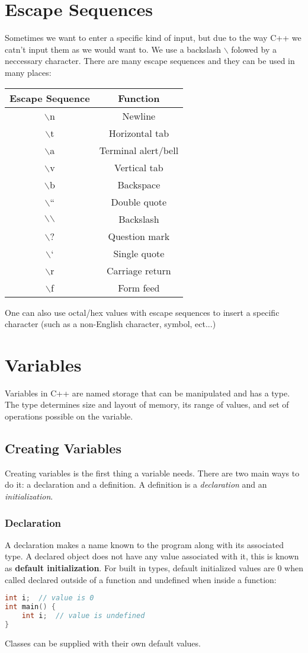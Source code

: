 \documentclass[12pt, a4paper]{report}
\begin{document}
\section{Escape Sequences}
Sometimes we want to enter a specific kind of input, but due to the way C++ we catn't input them as we would want to. We use a backslash $\backslash$ folowed by a neccessary character. There are many escape sequences and they can be used in many places:
\begin{center}
	\begin{tabular}{ |c|c| }
		\hline
		\textbf{Escape Sequence} & \textbf{Function} \\
		\hline
		$\backslash$n & Newline \\
		\hline
		$\backslash$t & Horizontal tab \\
		\hline
		$\backslash$a & Terminal alert/bell \\
		\hline
		$\backslash$v & Vertical tab \\
		\hline
		$\backslash$b & Backspace \\
		\hline
		$\backslash$`` & Double quote \\
		\hline
		$\backslash$$\backslash$ & Backslash \\
		\hline
		$\backslash$? & Question mark \\
		\hline
		$\backslash$` & Single quote \\
		\hline
		$\backslash$r & Carriage return \\
		\hline
		$\backslash$f & Form feed \\
		\hline
	\end{tabular}
\end{center}
One can also use octal/hex values with escape sequences to insert a specific character (such as a non-English character, symbol, ect...)
\section{Variables}
Variables in C++ are named storage that can be manipulated and has a type. The type determines size and layout of memory, its range of values, and set of operations possible on the variable.
\subsection{Creating Variables}
Creating variables is the first thing a variable needs. There are two main ways to do it: a declaration and a definition. A definition is a \emph{declaration} and an \emph{initialization}.
\subsubsection{Declaration}
A declaration makes a name known to the program along with its associated type. A declared object does not have any value associated with it, this is known as \textbf{default initialization}. For built in types, default initialized values are 0 when called declared outside of a function and undefined when inside a function:
\begin{lstlisting}[language=C++]
int i;	// value is 0
int main() {
	int i;	// value is undefined
}
\end{lstlisting}
\noindent Classes can be supplied with their own default values.
\end{document}
